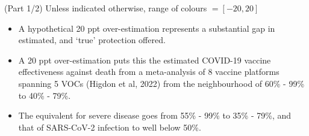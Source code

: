 \documentclass[aspectratio=169]{beamer}
\begin{document}
\begin{frame}{(Part 1/2) Unless indicated otherwise, range of colours $ = [-20, 20]$}
	\begin{itemize}
		\item A hypothetical 20 ppt over-estimation represents a substantial gap in estimated, and `true' protection offered.
		\item A 20 ppt over-estimation puts this the estimated COVID-19 vaccine effectiveness against death from a meta-analysis of 8 vaccine platforms spanning 5 VOCs (Higdon et al, 2022) from the neighbourhood of 60\% - 99\% to 40\% - 79\%.
		\item The equivalent for severe disease goes from 55\% - 99\% to 35\% - 79\%, and that of SARS-CoV-2 infection to well below 50\%.
	\end{itemize}
\end{frame}
\end{document}
